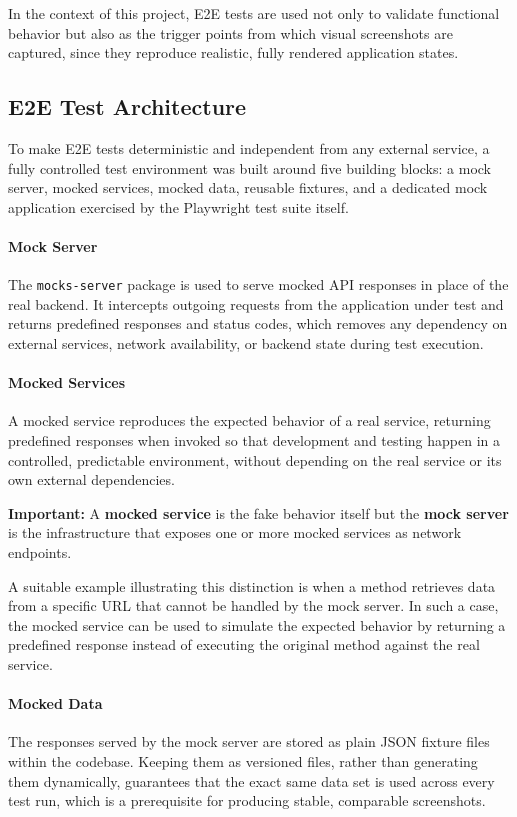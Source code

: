 In the context of this project, \ac{E2E} tests are used not only to validate functional behavior but also as the trigger points from which visual screenshots are captured, since they reproduce realistic, fully rendered application states.

\subsection{E2E Test Architecture}
 
To make \ac{E2E} tests deterministic and independent from any external service, a fully controlled test environment was built around five building blocks: a mock server, mocked services, mocked data, reusable fixtures, and a dedicated mock application exercised by the Playwright test suite itself.
 
\paragraph{Mock Server} The \texttt{mocks-server} package is used to serve mocked \ac{API} responses in place of the real backend. It intercepts outgoing requests from the application under test and returns predefined responses and status codes, which removes any dependency on external services, network availability, or backend state during test execution.
 
\paragraph{Mocked Services} A mocked service reproduces the expected behavior of a real service, returning predefined responses when invoked so that development and testing happen in a controlled, predictable environment, without depending on the real service or its own external dependencies.
 
\textbf{Important:} A \textbf{mocked service} is the fake behavior itself but the \textbf{mock server} is the infrastructure that exposes one or more mocked services as network endpoints.

A suitable example illustrating this distinction is when a method retrieves data from a specific URL that cannot be handled by the mock server. In such a case, the mocked service can be used to simulate the expected behavior by returning a predefined response instead of executing the original method against the real service.
 
\paragraph{Mocked Data} The responses served by the mock server are stored as plain JSON fixture files within the codebase. Keeping them as versioned files, rather than generating them dynamically, guarantees that the exact same data set is used across every test run, which is a prerequisite for producing stable, comparable screenshots.
 
